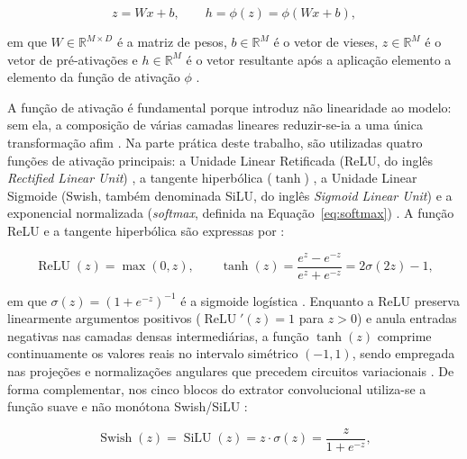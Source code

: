 \documentclass[
    12pt,
    openright,
    oneside,
    a4paper,
    english,
    brazil
]{abntex2}
\begin{document}
\begin{equation}
\label{eq:camada_densa}
z = Wx + b,
\qquad
h = \phi(z) = \phi(Wx + b),
\end{equation}

em que \(W \in \mathbb{R}^{M \times D}\) é a matriz de pesos, \(b \in \mathbb{R}^{M}\) é o vetor de vieses, \(z \in \mathbb{R}^{M}\) é o vetor de pré-ativações e \(h \in \mathbb{R}^{M}\) é o vetor resultante após a aplicação elemento a elemento da função de ativação \(\phi\) \cite{goodfellow2016deep,ponti2017comofunciona}.

A função de ativação é fundamental porque introduz não linearidade ao modelo: sem ela, a composição de várias camadas lineares reduzir-se-ia a uma única transformação afim \cite{goodfellow2016deep,ponti2017comofunciona}. Na parte prática deste trabalho, são utilizadas quatro funções de ativação principais: a Unidade Linear Retificada (ReLU, do inglês \textit{Rectified Linear Unit}) \cite{nair2010relu,goodfellow2016deep}, a tangente hiperbólica (\(\tanh\)) \cite{goodfellow2016deep,ponti2017comofunciona}, a Unidade Linear Sigmoide (Swish, também denominada SiLU, do inglês \textit{Sigmoid Linear Unit}) \cite{elfwing2018silu,ramachandran2017swish} e a exponencial normalizada (\textit{softmax}, definida na Equação~\eqref{eq:softmax}) \cite{goodfellow2016deep,ponti2017comofunciona}. A função ReLU e a tangente hiperbólica são expressas por \cite{nair2010relu,goodfellow2016deep,ponti2017comofunciona}:

\begin{equation}
\label{eq:ativacoes_relu_tanh}
\operatorname{ReLU}(z) = \max(0, z),
\qquad
\tanh(z) = \frac{e^z - e^{-z}}{e^z + e^{-z}} = 2\sigma(2z) - 1,
\end{equation}

em que \(\sigma(z) = (1 + e^{-z})^{-1}\) é a sigmoide logística \cite{goodfellow2016deep}. Enquanto a ReLU preserva linearmente argumentos positivos (\(\operatorname{ReLU}'(z) = 1\) para \(z > 0\)) e anula entradas negativas nas camadas densas intermediárias, a função \(\tanh(z)\) comprime continuamente os valores reais no intervalo simétrico \((-1, 1)\), sendo empregada nas projeções e normalizações angulares que precedem circuitos variacionais \cite{nair2010relu,goodfellow2016deep,ponti2017comofunciona}. De forma complementar, nos cinco blocos do extrator convolucional utiliza-se a função suave e não monótona Swish/SiLU \cite{elfwing2018silu,ramachandran2017swish}:

\begin{equation}
\label{eq:ativacao_swish_silu}
\operatorname{Swish}(z) = \operatorname{SiLU}(z) = z \cdot \sigma(z) = \frac{z}{1 + e^{-z}},
\end{equation}
\end{document}
